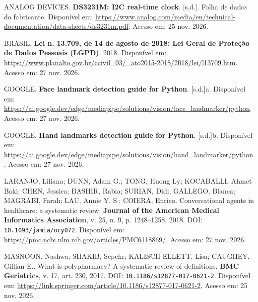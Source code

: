 \begingroup
\setlength{\labelsep}{0pt}
\begin{thebibliography}{99}
\providecommand{\abntrefinfo}[3]{}
\providecommand{\abntbstabout}[1]{}

\abntrefinfo{Analog Devices}{Analog Devices}{[s.d.]}
ANALOG DEVICES. \textbf{DS3231M: I2C real-time clock}. [s.d.]. Folha de dados do fabricante. Disponível em: \url{https://www.analog.com/media/en/technical-documentation/data-sheets/ds3231m.pdf}. Acesso em: 25 nov. 2026.

\abntrefinfo{Brasil}{Brasil}{2018}
BRASIL. \textbf{Lei n. 13.709, de 14 de agosto de 2018: Lei Geral de Proteção de Dados Pessoais ({LGPD})}. 2018. Disponível em: \url{https://www.planalto.gov.br/ccivil_03/_ato2015-2018/2018/lei/l13709.htm}. Acesso em: 27 nov. 2026.

\abntrefinfo{Google}{Google}{[s.d.]a}
GOOGLE. \textbf{Face landmark detection guide for Python}. [s.d.]a. Disponível em: \url{https://ai.google.dev/edge/mediapipe/solutions/vision/face_landmarker/python}. Acesso em: 27 nov. 2026.

\abntrefinfo{Google}{Google}{[s.d.]b}
GOOGLE. \textbf{Hand landmarks detection guide for Python}. [s.d.]b. Disponível em: \url{https://ai.google.dev/edge/mediapipe/solutions/vision/hand_landmarker/python}. Acesso em: 27 nov. 2026.

\abntrefinfo{Laranjo \textit{et al.}}{Laranjo \textit{et al.}}{2018}
LARANJO, Liliana; DUNN, Adam G.; TONG, Huong Ly; KOCABALLI, Ahmet Baki; CHEN, Jessica; BASHIR, Rabia; SURIAN, Didi; GALLEGO, Blanca; MAGRABI, Farah; LAU, Annie Y. S.; COIERA, Enrico. Conversational agents in healthcare: a systematic review. \textbf{Journal of the American Medical Informatics Association}, v. 25, n. 9, p. 1248--1258, 2018. DOI: \nolinkurl{10.1093/jamia/ocy072}. Disponível em: \url{https://pmc.ncbi.nlm.nih.gov/articles/PMC6118869/}. Acesso em: 27 nov. 2026.

\abntrefinfo{Masnoon \textit{et al.}}{Masnoon \textit{et al.}}{2017}
MASNOON, Nashwa; SHAKIB, Sepehr; KALISCH-ELLETT, Lisa; CAUGHEY, Gillian E.. What is polypharmacy? A systematic review of definitions. \textbf{BMC Geriatrics}, v. 17, art. 230, 2017. DOI: \nolinkurl{10.1186/s12877-017-0621-2}. Disponível em: \url{https://link.springer.com/article/10.1186/s12877-017-0621-2}. Acesso em: 25 nov. 2026.


\end{thebibliography}
